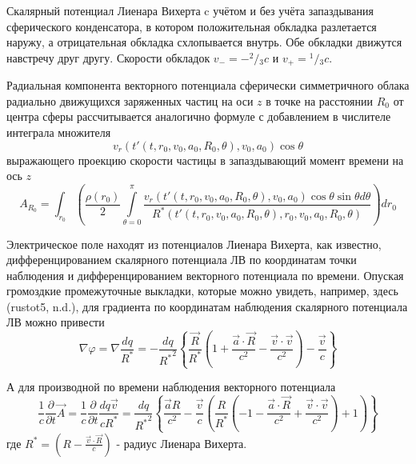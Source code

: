 ﻿\documentclass[12pt, letterpaper]{article}
\begin{document}
Скалярный потенциал Лиенара Вихерта c учётом и без учёта запаздывания сферического конденсатора, в котором положительная обкладка разлетается наружу, а отрицательная обкладка схлопывается внутрь. Обе обкладки движутся навстречу друг другу. Скорости обкладок ${{v}_{-}}=-{}^{2}/{}_{3}c$ и ${{v}_{+}}={}^{1}/{}_{3}c$.

Радиальная компонента векторного потенциала сферически симметричного облака радиально движущихся заряженных частиц на оси $z$ в точке на расстоянии ${{R}_{0}}$ от центра сферы рассчитывается аналогично формуле  с добавлением в числителе интеграла множителя \[{{v}_{r}}\left( t'\left( t,{{r}_{0}},{{v}_{0}},{{a}_{0}},{{R}_{0}},\theta  \right),{{v}_{0}},{{a}_{0}} \right)\cos \theta \] выражающего проекцию скорости частицы в запаздывающий момент времени на ось $z$ 
	\[{{A}_{{{R}_{0}}}}=\int_{{{r}_{0}}}{\left( \frac{\rho \left( {{r}_{0}} \right)}{2}\int\limits_{\theta =0}^{\pi }{\frac{{{v}_{r}}\left( t'\left( t,{{r}_{0}},{{v}_{0}},{{a}_{0}},{{R}_{0}},\theta  \right),{{v}_{0}},{{a}_{0}} \right)\cos \theta \sin \theta d\theta }{{{R}^{*}}\left( t'\left( t,{{r}_{0}},{{v}_{0}},{{a}_{0}},{{R}_{0}},\theta  \right),{{r}_{0}},{{v}_{0}},{{a}_{0}},{{R}_{0}},\theta  \right)}} \right)}d{{r}_{0}}\] 	

Электрическое поле находят из потенциалов Лиенара Вихерта, как известно, дифференцированием скалярного потенциала ЛВ по координатам точки наблюдения и дифференцированием векторного потенциала по времени. Опуская громоздкие промежуточные выкладки, которые можно увидеть, например, здесь (rustot5, n.d.), для градиента по координатам наблюдения скалярного потенциала ЛВ можно привести
	\[\nabla \varphi =\nabla \frac{dq}{{{R}^{*}}}=-\frac{dq}{{{R}^{*}}^{2}}\left\{ \frac{\overrightarrow{R}}{{{R}^{*}}}\left( 1+\frac{\overrightarrow{a}\cdot \overrightarrow{R}}{{{c}^{2}}}-\frac{\overrightarrow{v}\cdot \overrightarrow{v}}{{{c}^{2}}} \right)-\frac{\overrightarrow{v}}{c} \right\}\] 	

А для производной по времени наблюдения векторного потенциала 
	\[\frac{1}{c}\frac{\partial }{\partial t}\overrightarrow{A}=\frac{1}{c}\frac{\partial }{\partial t}\frac{dq\overrightarrow{v}}{c{{R}^{*}}}=\frac{dq}{{{R}^{*}}^{2}}\left\{ \frac{\overrightarrow{a}R}{{{c}^{2}}}-\frac{\overrightarrow{v}}{c}\left( \frac{R}{{{R}^{*}}}\left( -1-\frac{\overrightarrow{a}\cdot \overrightarrow{R}}{{{c}^{2}}}+\frac{\overrightarrow{v}\cdot \overrightarrow{v}}{{{c}^{2}}} \right)+1 \right) \right\}\] 	
где ${{R}^{*}}=\left( R-\frac{\overrightarrow{v}\cdot \overrightarrow{R}}{c} \right)$ - радиус Лиенара Вихерта.
\end{document}
